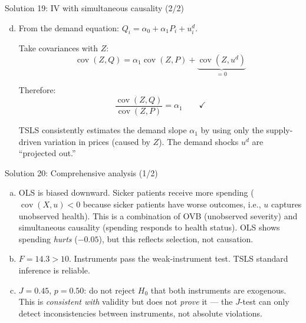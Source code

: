 \documentclass[10pt]{beamer}
\begin{document}
\begin{frame}{Solution 19: IV with simultaneous causality (2/2)}
\label{s19b}
\begin{enumerate}[(a)]
  \setcounter{enumi}{3}
  \item From the demand equation: $Q_i = \alpha_0 + \alpha_1 P_i + u_i^d$.

  Take covariances with $Z$:
  \[
  \operatorname{cov}(Z, Q) = \alpha_1\operatorname{cov}(Z, P) + \underbrace{\operatorname{cov}(Z, u^d)}_{=0}
  \]

  Therefore:
  \[
  \frac{\operatorname{cov}(Z, Q)}{\operatorname{cov}(Z, P)} = \alpha_1 \qquad \checkmark
  \]

  TSLS consistently estimates the demand slope $\alpha_1$ by using only the supply-driven variation in prices (caused by $Z$). The demand shocks $u^d$ are ``projected out.''
\end{enumerate}

\vfill
\hfill\hyperlink{q19}{}
\end{frame}

\begin{frame}{Solution 20: Comprehensive analysis (1/2)}
\label{s20}
\begin{enumerate}[(a)]
  \item OLS is biased \alert{downward}. Sicker patients receive more spending ($\operatorname{cov}(X, u) < 0$ because sicker patients have worse outcomes, i.e., $u$ captures unobserved health). This is a combination of OVB (unobserved severity) and simultaneous causality (spending responds to health status). OLS shows spending \emph{hurts} ($-0.05$), but this reflects selection, not causation.

  \item $F = 14.3 > 10$. Instruments pass the weak-instrument test. TSLS standard inference is reliable.

  \item $J = 0.45$, $p = 0.50$: \alert{do not reject} $H_0$ that both instruments are exogenous. This is \emph{consistent with} validity but does not \emph{prove} it --- the $J$-test can only detect inconsistencies between instruments, not absolute violations.
\end{enumerate}

\vfill
\hfill\hyperlink{s20b}{}
\hfill\hyperlink{q20}{}
\end{frame}
\end{document}
